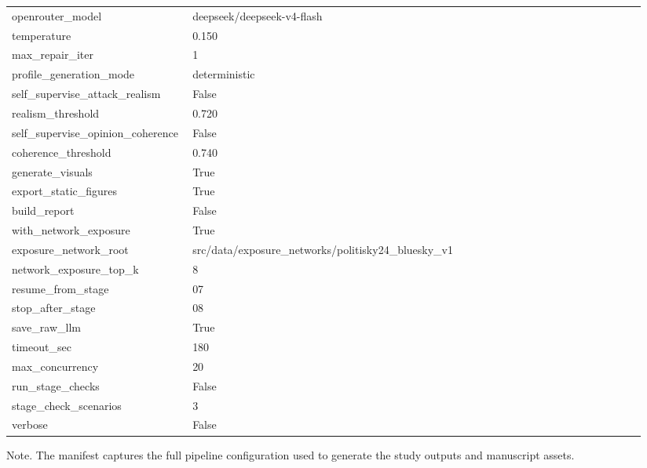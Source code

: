 \begin{table}[htbp]
\begin{threeparttable}
\begin{tabular}{p{0.24\linewidth}p{0.70\linewidth}}
openrouter\_model & deepseek/deepseek-v4-flash \\
temperature & 0.150 \\
max\_repair\_iter & 1 \\
profile\_generation\_mode & deterministic \\
self\_supervise\_attack\_realism & False \\
realism\_threshold & 0.720 \\
self\_supervise\_opinion\_coherence & False \\
coherence\_threshold & 0.740 \\
generate\_visuals & True \\
export\_static\_figures & True \\
build\_report & False \\
with\_network\_exposure & True \\
exposure\_network\_root & src/data/exposure\_networks/politisky24\_bluesky\_v1 \\
network\_exposure\_top\_k & 8 \\
resume\_from\_stage & 07 \\
stop\_after\_stage & 08 \\
save\_raw\_llm & True \\
timeout\_sec & 180 \\
max\_concurrency & 20 \\
run\_stage\_checks & False \\
stage\_check\_scenarios & 3 \\
verbose & False \\
\bottomrule
\end{tabular}
\begin{tablenotes}[flushleft]
\footnotesize
\item Note. The manifest captures the full pipeline configuration used to generate the study outputs and manuscript assets.
\end{tablenotes}
\end{threeparttable}
\end{table}